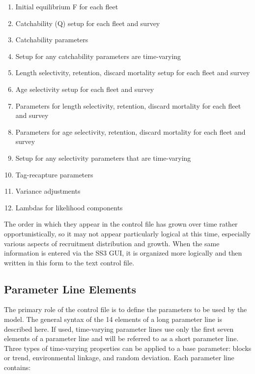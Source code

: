 \begin{enumerate}
		\item Initial equilibrium F for each fleet
		\\
		\item Catchability (Q) setup for each fleet and survey
		\item Catchability parameters
		\item Setup for any catchability parameters are time-varying
		\\
		\item Length selectivity, retention, discard mortality setup for each fleet and survey
		\item Age selectivity setup for each fleet and survey
		\item Parameters for length selectivity, retention, discard mortality for each fleet and survey
		\item Parameters for age selectivity, retention, discard mortality for each fleet and survey
		\item Setup for any selectivity parameters that are time-varying
		\\
		\item Tag-recapture parameters
		\\
		\item Variance adjustments
		\item Lambdas for likelihood components
	\end{enumerate}
The order in which they appear in the control file has grown over time rather opportunistically, so it may not appear particularly logical at this time, especially various aspects of recruitment distribution and growth. When the same information is entered via the SS3 GUI, it is organized more logically and then written in this form to the text control file.

\subsection{Parameter Line Elements}
The primary role of the control file is to define the parameters to be used by the model. The general syntax of the 14 elements of a long parameter line is described here. If used, time-varying parameter lines use only the first seven elements of a parameter line and will be referred to as a short parameter line. Three types of time-varying properties can be applied to a base parameter: blocks or trend, environmental linkage, and random deviation. Each parameter line contains:

